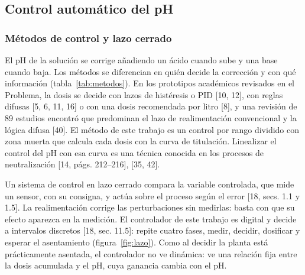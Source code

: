 \subsection{Control automático del pH}\label{sec:teocontrol}

\subsubsection{Métodos de control y lazo cerrado}\label{sec:metodos}
El pH de la solución se corrige añadiendo un ácido cuando sube y una base cuando baja. Los métodos se diferencian en quién decide la corrección y con qué información (tabla~\ref{tab:metodos}). En los prototipos académicos revisados en el Problema, la dosis se decide con lazos de histéresis o PID [10, 12], con reglas difusas [5, 6, 11, 16] o con una dosis recomendada por litro [8], y una revisión de 89 estudios encontró que predominan el lazo de realimentación convencional y la lógica difusa [40]. El método de este trabajo es un control por rango dividido con zona muerta que calcula cada dosis con la curva de titulación. Linealizar el control del pH con esa curva es una técnica conocida en los procesos de neutralización [14, págs. 212–216], [35, 42].


Un sistema de control en lazo cerrado compara la variable controlada, que mide un sensor, con su consigna, y actúa sobre el proceso según el error [18, secs. 1.1 y 1.5]. La realimentación corrige las perturbaciones sin medirlas: basta con que su efecto aparezca en la medición. El controlador de este trabajo es digital y decide a intervalos discretos [18, sec. 11.5]: repite cuatro fases, medir, decidir, dosificar y esperar el asentamiento (figura~\ref{fig:lazo}). Como al decidir la planta está prácticamente asentada, el controlador no ve dinámica: ve una relación fija entre la dosis acumulada y el pH, cuya ganancia cambia con el pH.


